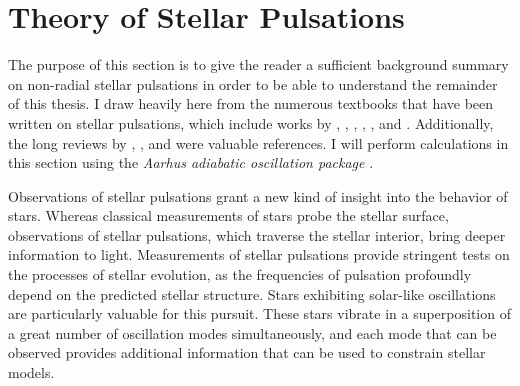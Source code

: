 \section{Theory of Stellar Pulsations} 
\label{sec:pulsation}
\begin{shaded}
\noindent The purpose of this section is to give the reader a sufficient background summary on non-radial stellar pulsations in order to be able to understand the remainder of this thesis. 
I draw heavily here from the numerous textbooks that have been written on stellar pulsations, which include works by \cite{1926ics..book.....E}, \cite{1949ptvs.book.....R}, \cite{1979nos..book.....U}, \cite{1980tsp..book.....C}, \cite{2010aste.book.....a}, and \cite{basuchaplin2017}. 
Additionally, the long reviews by \cite{1958HDP....51..353L}, \citet{1993afd..conf..399G}, and \citet{2016lrsp...13....2b} were valuable references. 
I will perform calculations in this section using the \emph{Aarhus adiabatic oscillation package} \citep[\textsc{ADIPLS},][]{2008Ap&SS.316..113C}. 
\end{shaded}

Observations of stellar pulsations grant a new kind of insight into the behavior of stars. 
Whereas classical measurements of stars probe the stellar surface, observations of stellar pulsations, which traverse the stellar interior, bring deeper information to light. 
Measurements of stellar pulsations provide stringent tests on the processes of stellar evolution, as the frequencies of pulsation profoundly depend on the predicted stellar structure. 
Stars exhibiting solar-like oscillations are particularly valuable for this pursuit. 
These stars vibrate in a superposition of a great number of oscillation modes simultaneously, and each mode that can be observed provides additional information that can be used to constrain stellar models. 

